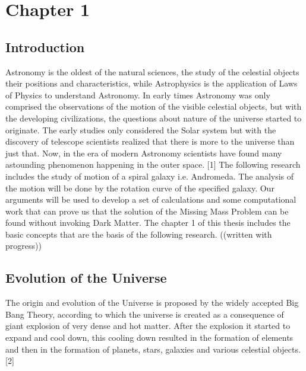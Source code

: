 \documentclass{article}
\begin{document}
\section{Chapter 1}
\subsection{Introduction}
Astronomy is the oldest of the natural sciences, the study of the celestial objects their positions and characteristics, while Astrophysics is the application of Laws of Physics to understand Astronomy. In early times Astronomy was only comprised  the observations of the motion of the visible celestial objects, but with the developing civilizations, the questions about nature of the universe started to originate. The early studies only considered the Solar system but with the discovery of telescope scientists realized that there is more to the universe than just that. Now, in the era of modern Astronomy scientists have found many astounding phenomenon happening in the outer space. [1]
The following research includes the study of motion of a spiral galaxy i.e. Andromeda. The analysis of the motion will be done by the rotation curve of the specified galaxy. Our arguments will  be used to develop a set of calculations and some computational work that can prove us that the solution of the Missing Mass Problem can be found without invoking Dark Matter. 
The chapter 1 of this thesis includes the basic concepts that are the basis of the following research.
((written with progress)) 

\subsection{Evolution of the Universe}
 The origin and evolution of the Universe is proposed by the widely accepted Big Bang Theory, according to which the universe is created as a consequence of giant explosion of very dense and hot matter. After the explosion it started to expand and cool down, this cooling down resulted in the formation of elements and then in the formation of planets, stars, galaxies and various celestial objects. [2]
 
\end{document}
